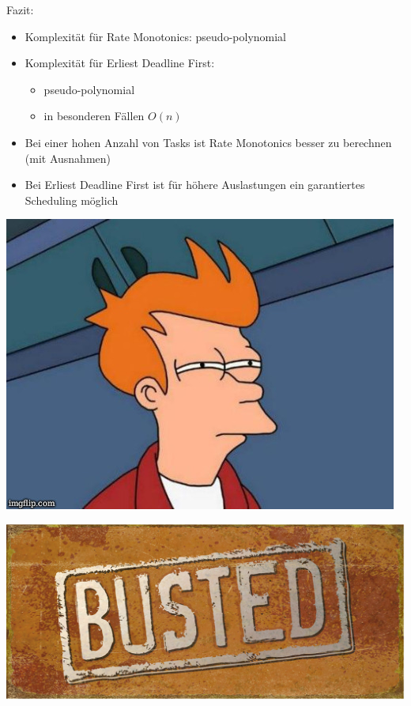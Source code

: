 \begin{frame}{\subsecname}
	Fazit:
	\begin{itemize}
		\item Komplexität für Rate Monotonics: pseudo-polynomial
		\item Komplexität für Erliest Deadline First:
		\begin{itemize}
			\item pseudo-polynomial
			\item in besonderen Fällen $O(n)$
		\end{itemize}
		\item Bei einer hohen Anzahl von Tasks ist Rate Monotonics besser zu berechnen (mit Ausnahmen)
		\item Bei Erliest Deadline First ist für höhere Auslastungen ein garantiertes Scheduling möglich
	\end{itemize}
\end{frame}

\begin{frame}{\subsecname}
	\begin{center}
			\includegraphics[scale=.4]{graphics/memes/fry.jpg}
	\end{center}
\end{frame}

\begin{frame}{\subsecname}
	\begin{center}
			\includegraphics[scale=1]{graphics/memes/busted.jpg}
	\end{center}
\end{frame}

